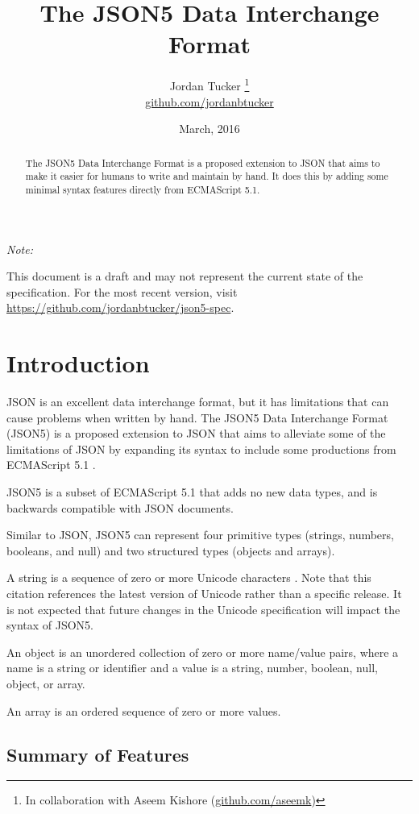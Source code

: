 \documentclass{article}
\title{The JSON5 Data Interchange Format}
\author{
	Jordan Tucker
	\thanks{
		In collaboration with Aseem Kishore
		(\href{https://github.com/aseemk}{github.com/aseemk})
	}\\
	\href{https://github.com/jordanbtucker}{github.com/jordanbtucker}
}
\date{March, 2016}
\newenvironment{note}{
    \bigskip
	\begin{samepage}
	\begin{adjustwidth}{0.5cm}{0.5cm}
		\emph{Note:}%
		}{
	\end{adjustwidth}
	\end{samepage}
    \bigskip
}
\begin{document}
\maketitle

\begin{note}
This document is a draft and may not represent the current state of the
specification. For the most recent version, visit
\url{https://github.com/jordanbtucker/json5-spec}.
\end{note}

\begin{abstract}
The JSON5 Data Interchange Format is a proposed extension to JSON that aims to
make it easier for humans to write and maintain by hand. It does this by adding
some minimal syntax features directly from ECMAScript 5.1.
\end{abstract}

\tableofcontents

\section{Introduction}

JSON \cite{json} \cite{rfc7159} is an excellent data interchange format, but it
has limitations that can cause problems when written by hand. The JSON5 Data
Interchange Format (JSON5) is a proposed extension to JSON that aims to
alleviate some of the limitations of JSON by expanding its syntax to include
some productions from ECMAScript 5.1 \cite{es5}.

JSON5 is a subset of ECMAScript 5.1 that adds no new data types, and is
backwards compatible with JSON documents.

Similar to JSON, JSON5 can represent four primitive types (strings, numbers,
booleans, and null) and two structured types (objects and arrays).

A string is a sequence of zero or more Unicode characters \cite{unicode}. Note
that this citation references the latest version of Unicode rather than a
specific release. It is not expected that future changes in the Unicode
specification will impact the syntax of JSON5.

An object is an unordered collection of zero or more name/value pairs, where a
name is a string or identifier and a value is a string, number, boolean, null,
object, or array.

An array is an ordered sequence of zero or more values.

\subsection{Summary of Features}
\end{document}
